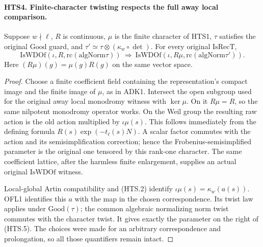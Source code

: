 \documentclass[11pt,a4paper]{article}
\numberwithin{equation}{section}
\theoremstyle{remark}\newtheorem{remark}[theorem]{Remark}
\begin{document}
\paragraph{HTS4. Finite-character twisting respects the full away local comparison.}
\label{claim:HTS4}
Suppose $w\nmid\ell$, $R$ is continuous, $\mu$ is the finite
character of HTS1, $\tau$ satisfies the original $\mathrm{Good}$
guard, and $\tau'\simeq\tau\otimes(\kappa_w\circ\det)$.
For every original $\mathrm{IsRecT}$,
\[
 \mathrm{IsWDOf}(\iota,R,\mathrm{rc}(\mathrm{algNorm}\tau))
 \ \Longrightarrow\
 \mathrm{IsWDOf}(\iota,R\mu,\mathrm{rc}(\mathrm{algNorm}\tau')).
                                                               \tag{HTS.5}
\]
Here $(R\mu)(g)=\mu(g)R(g)$ on the same vector space.
\begin{proof}
Choose a finite coefficient field containing the representation's
compact image and the finite image of $\mu$, as in ADK1.
Intersect the open subgroup used for the original away local
monodromy witness with $\ker\mu$.  On it $R\mu=R$, so the
same nilpotent monodromy operator works.  On the Weil group
the resulting raw action is the old action multiplied by
$\iota\mu(s)$.  This follows immediately from the defining
formula $R(s)\exp(-t_\ell(s)N)$.  A scalar factor commutes with
the action and its semisimplification correction; hence the
Frobenius-semisimplified parameter is the original one tensored
by this rank-one character.  The same coefficient lattice,
after the harmless finite enlargement, supplies an actual
original $\mathrm{IsWDOf}$ witness.

Local-global Artin compatibility and (HTS.2) identify
$\iota\mu(s)=\kappa_w(a(s))$.  OFL1 identifies this $a$ with
the map in the chosen correspondence.  Its twist law applies
under $\mathrm{Good}(\tau)$; the common algebraic normalizing
norm twist commutes with the character twist.  It gives exactly
the parameter on the right of (HTS.5).  The choices were made
for an arbitrary correspondence and prolongation, so all those
quantifiers remain intact.
\end{proof}

\end{document}

